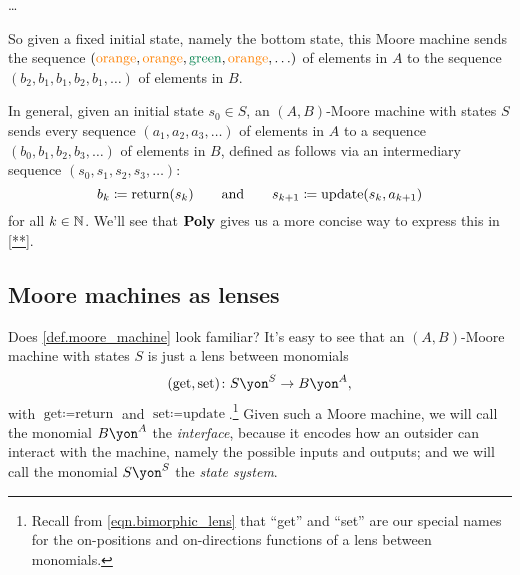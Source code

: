 \documentclass[Book-Poly]{subfiles}
\begin{document}
\begin{example}
\begin{enumerate}
    \ldots
    
    So given a fixed initial state, namely the bottom state, this Moore machine sends the sequence $({\color{orange}\text{orange}}, {\color{orange}\text{orange}}, {\color{dgreen}\text{green}}, {\color{orange}\text{orange}},\ldots)$ of elements in $A$ to the sequence $(b_2,b_1,b_1,b_2,b_1,\ldots)$ of elements in $B$.
\end{enumerate}
\end{example}

In general, given an initial state $s_0\in S$, an $(A,B)$-Moore machine with states $S$ sends every sequence $(a_1,a_2,a_3,\ldots)$ of elements in $A$ to a sequence $(b_0,b_1,b_2,b_3,\ldots)$ of elements in $B$, defined as follows via an intermediary sequence $(s_0,s_1,s_2,s_3,\ldots)$:
\[
    b_k\coloneqq \text{return}(s_k) \qquad\text{and}\qquad s_{k+1}\coloneqq \text{update}(s_k, a_{k+1})
\]
for all $k\in\mathbb{N}$.
We'll see that $\mathbf{Poly}$ gives us a more concise way to express this in \cref{**}.

\subsection{Moore machines as lenses}

Does \cref{def.moore_machine} look familiar?
It's easy to see that an $(A,B)$-Moore machine with states $S$ is just a lens between monomials
\[
(\text{get}, \text{set})\colon S\yon^S\to B\yon^A,
\]
with $\text{get} \coloneqq \text{return}$ and $\text{set} \coloneqq \text{update}$.\footnote{Recall from \eqref{eqn.bimorphic_lens} that ``get'' and ``set'' are our special names for the on-positions and on-directions functions of a lens between monomials.}
Given such a Moore machine, we will call the monomial $B\yon^A$ the \emph{interface}, because it encodes how an outsider can interact with the machine, namely the possible inputs and outputs; and we will call the monomial $S\yon^S$ the \emph{state system}.
\end{document}

